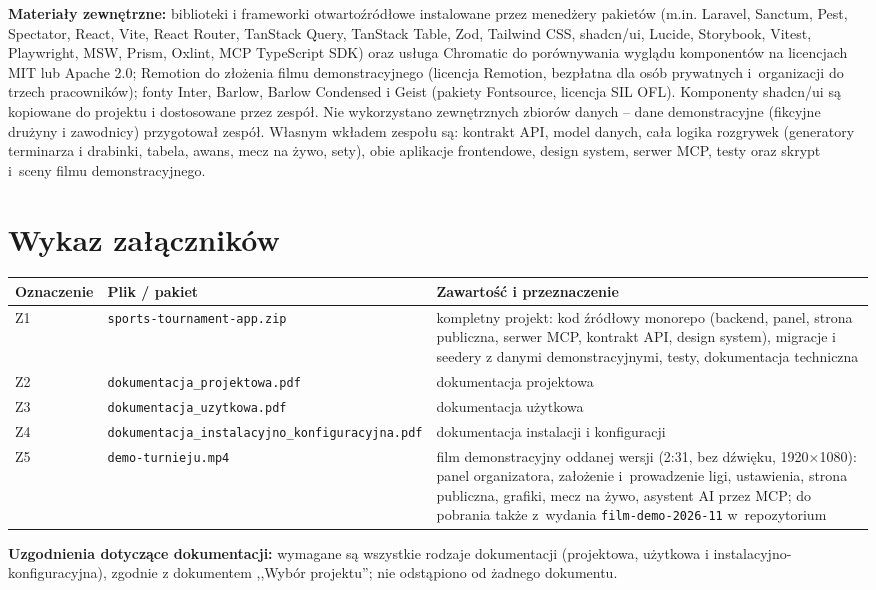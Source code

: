 \documentclass[11pt,a4paper,oneside]{article}
\newif\ifpodpowiedzi
\newcommand{\podpowiedz}[1]{\ifpodpowiedzi\par\begingroup\small\color{hintcolor}\textit{Wskazówka: #1}\par\endgroup\fi}
\begin{document}
\textbf{Materiały zewnętrzne:} biblioteki i frameworki otwartoźródłowe instalowane przez menedżery pakietów (m.in. Laravel, Sanctum, Pest, Spectator, React, Vite, React Router, TanStack Query, TanStack Table, Zod, Tailwind CSS, shadcn/ui, Lucide, Storybook, Vitest, Playwright, MSW, Prism, Oxlint, MCP TypeScript SDK) oraz usługa Chromatic do porównywania wyglądu komponentów na licencjach MIT lub Apache 2.0; Remotion do złożenia filmu demonstracyjnego (licencja Remotion, bezpłatna dla osób prywatnych i~organizacji do trzech pracowników); fonty Inter, Barlow, Barlow Condensed i Geist (pakiety Fontsource, licencja SIL OFL). Komponenty shadcn/ui są kopiowane do projektu i dostosowane przez zespół. Nie wykorzystano zewnętrznych zbiorów danych -- dane demonstracyjne (fikcyjne drużyny i zawodnicy) przygotował zespół. Własnym wkładem zespołu są: kontrakt API, model danych, cała logika rozgrywek (generatory terminarza i drabinki, tabela, awans, mecz na żywo, sety), obie aplikacje frontendowe, design system, serwer MCP, testy oraz skrypt i~sceny filmu demonstracyjnego.


\section{Wykaz załączników}
\podpowiedz{Wymień wszystkie oddawane pliki i pakiety wraz z krótkim opisem. Zakres dokumentacji powinien być zgodny z ustaleniami prowadzących. Wskaż kompletny projekt z kodem lub innymi plikami źródłowymi, zasobami i plikami wynikowymi oraz obowiązkowe nagranie. Dokumenty oddaje się w PDF. W razie niewymagania danego rodzaju dokumentacji odnotuj uzgodnienie i uzasadnienie pod tabelą. Dodaj wiersze według potrzeb.}
\begin{tabularx}{\textwidth}{@{}p{} Y Y@{}}
\toprule
Oznaczenie & Plik / pakiet & Zawartość i przeznaczenie\\
\midrule
Z1 & \texttt{sports-tournament-app.zip} & kompletny projekt: kod źródłowy monorepo (backend, panel, strona publiczna, serwer MCP, kontrakt API, design system), migracje i seedery z danymi demonstracyjnymi, testy, dokumentacja techniczna\\
Z2 & \texttt{dokumentacja\_projektowa.pdf} & dokumentacja projektowa\\
Z3 & \texttt{dokumentacja\_uzytkowa.pdf} & dokumentacja użytkowa\\
Z4 & \texttt{dokumentacja\_\allowbreak instalacyjno\_\allowbreak konfiguracyjna.pdf} & dokumentacja instalacji i konfiguracji\\
Z5 & \texttt{demo-turnieju.mp4} & film demonstracyjny oddanej wersji (2:31, bez dźwięku, 1920$\times$1080): panel organizatora, założenie i~prowadzenie ligi, ustawienia, strona publiczna, grafiki, mecz na żywo, asystent AI przez MCP; do pobrania także z~wydania \texttt{film-demo-2026-11} w~repozytorium\\
\bottomrule
\end{tabularx}
\textbf{Uzgodnienia dotyczące dokumentacji:} wymagane są wszystkie rodzaje dokumentacji (projektowa, użytkowa i instalacyjno-konfiguracyjna), zgodnie z dokumentem ,,Wybór projektu''; nie odstąpiono od żadnego dokumentu.
\end{document}
